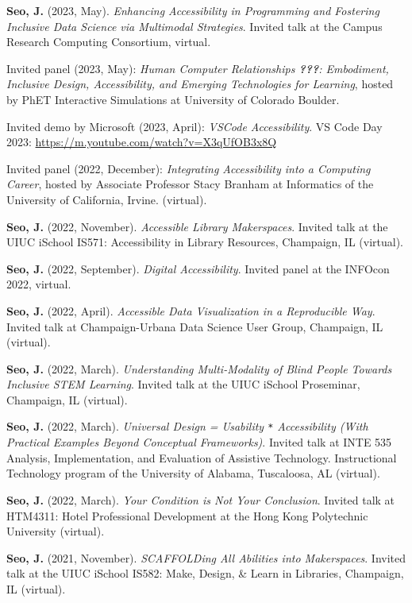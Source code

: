 \documentclass[11pt,a4paper,]{awesome-cv}
\begin{document}
\textbf{Seo, J.} (2023, May). \emph{Enhancing Accessibility in
  Programming and Fostering Inclusive Data Science via Multimodal
  Strategies}. Invited talk at the Campus Research Computing Consortium,
virtual.

Invited panel (2023, May): \emph{Human Computer Relationships
    {\textbf{???}}: Embodiment, Inclusive Design, Accessibility, and
  Emerging Technologies for Learning}, hosted by PhET Interactive
Simulations at University of Colorado Boulder.

Invited demo by Microsoft (2023, April): \emph{VSCode Accessibility}. VS
Code Day 2023: \url{https://m.youtube.com/watch?v=X3qUfOB3x8Q}

Invited panel (2022, December): \emph{Integrating Accessibility into a
  Computing Career}, hosted by Associate Professor Stacy Branham at
Informatics of the University of California, Irvine. (virtual).

\textbf{Seo, J.} (2022, November). \emph{Accessible Library
  Makerspaces}. Invited talk at the UIUC iSchool IS571: Accessibility in
Library Resources, Champaign, IL (virtual).

\textbf{Seo, J.} (2022, September). \emph{Digital Accessibility}.
Invited panel at the INFOcon 2022, virtual.

\textbf{Seo, J.} (2022, April). \emph{Accessible Data Visualization in a
  Reproducible Way}. Invited talk at Champaign-Urbana Data Science User
Group, Champaign, IL (virtual).

\textbf{Seo, J.} (2022, March). \emph{Understanding Multi-Modality of
  Blind People Towards Inclusive STEM Learning}. Invited talk at the UIUC
iSchool Proseminar, Champaign, IL (virtual).

\textbf{Seo, J.} (2022, March). \emph{Universal Design = Usability
  \texttt{*} Accessibility (With Practical Examples Beyond Conceptual
  Frameworks)}. Invited talk at INTE 535 Analysis, Implementation, and
Evaluation of Assistive Technology. Instructional Technology program of
the University of Alabama, Tuscaloosa, AL (virtual).

\textbf{Seo, J.} (2022, March). \emph{Your Condition is Not Your
  Conclusion}. Invited talk at HTM4311: Hotel Professional Development at
the Hong Kong Polytechnic University (virtual).

\textbf{Seo, J.} (2021, November). \emph{SCAFFOLDing All Abilities into
  Makerspaces}. Invited talk at the UIUC iSchool IS582: Make, Design, \&
Learn in Libraries, Champaign, IL (virtual).
\end{document}
